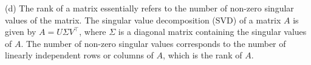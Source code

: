 (d) The rank of a matrix essentially refers to the number of non-zero singular values of the matrix. The singular value decomposition (SVD) of a matrix $A$ is given by $A = U\Sigma V^{\top}$, where $\Sigma$ is a diagonal matrix containing the singular values of $A$. The number of non-zero singular values corresponds to the number of linearly independent rows or columns of $A$, which is the rank of $A$.







\newpage
